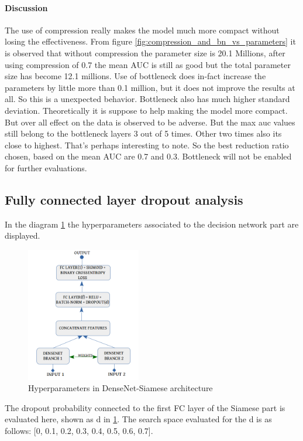 \paragraph{Discussion\\}
The use of compression really makes the model much more compact without losing the effectiveness. From figure \ref{fig:compression_and_bn_vs_parameters} it is observed that without compression the parameter size is 20.1 Millions, 
after using compression of 0.7 the mean AUC is still as good but the total parameter size has become 12.1 millions. Use of bottleneck does in-fact increase the parameters by little more than 0.1 million, but it does not improve the 
results at all. So this is a unexpected behavior. Bottleneck also has much higher standard deviation. Theoretically it is suppose to help making the model more compact. But over all effect on the data is observed to be adverse.
But the max auc values still belong to the bottleneck layers 3 out of 5 times. Other two times also its close to highest. That's perhaps interesting to note. So the best reduction ratio chosen, based on the mean AUC are 0.7 and 0.3.
Bottleneck will not be enabled for further evaluations.

\subsection{Fully connected layer dropout analysis}
In the diagram \ref{fig:siamese_densenet_structure_wraped} the hyperparameters associated to the decision network part are displayed. 

\begin{figure}
\includegraphics[width=5cm]{images/densenet/siamese_densenet_structure}
\caption{Hyperparameters in DenseNet-Siamese architecture}
\label{fig:siamese_densenet_structure_wraped}
\end{figure}  

The dropout probability connected to the first FC layer of the Siamese part is evaluated here, shown as d in \ref{fig:siamese_densenet_structure_wraped}. The search space evaluated for the d is as follows: [0, 0.1, 0.2, 0.3, 0.4, 0.5, 0.6, 0.7].

